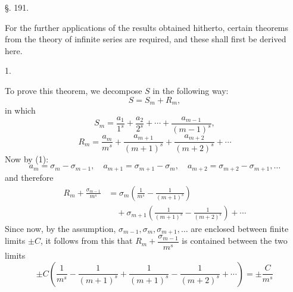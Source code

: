 \begin{center}
§. 191.

\end{center}

For the further applications of the results obtained hitherto, certain theorems from the theory of infinite series are required, and these shall first be derived here.

1. 





To prove this theorem, we decompose $S$ in the following way:
\[
S = S_m+R_m,
\]
in which
\[
S_m = \frac{a_1}{1^s}+\frac{a_2}{2^s}+\cdots+\frac{a_{m-1}}{(m-1)^s},
\]
\[
R_m = \frac{a_m}{m^s}+\frac{a_{m+1}}{(m+1)^s}+\frac{a_{m+2}}{(m+2)^s}+\cdots
\]
Now by (1):
\[
a_m = \sigma_m-\sigma_{m-1}, \quad a_{m+1}=\sigma_{m+1}-\sigma_m, \quad a_{m+2}=\sigma_{m+2}-\sigma_{m+1}, \ldots
\]
and therefore
\[
\begin{aligned}
R_m+\frac{\sigma_{m-1}}{m^s}
&= \sigma_m\left(\frac{1}{m^s}-\frac{1}{(m+1)^s}\right) \\
&\quad +\sigma_{m+1}\left(\frac{1}{(m+1)^s}-\frac{1}{(m+2)^s}\right)+\cdots
\end{aligned}
\]
Since now, by the assumption, $\sigma_{m-1}, \sigma_m, \sigma_{m+1}, \ldots$ are enclosed between finite limits $\pm C$, it follows from this that $R_m+\dfrac{\sigma_{m-1}}{m^s}$ is contained between the two limits
\[
\pm C\left(\frac{1}{m^s}-\frac{1}{(m+1)^s}+\frac{1}{(m+1)^s}-\frac{1}{(m+2)^s}+\cdots\right) = \pm\frac{C}{m^s}
\]
